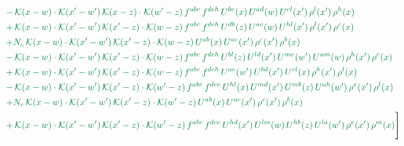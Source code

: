 \documentclass[10pt]{article}
\numberwithin{equation}{section}
\begin{document}
\begin{align}
&{\color{JIM} -\,\mathcal{K}(x-w)\cdot\mathcal{K}(x'-w')\,\mathcal{K}(x-z)\cdot\mathcal{K}(w'-z)\,f^{abc}\,f^{deh}\,U^{be}(x)\,U^{ad}(w)\,U^{cl}(x')\,\rho^{l}(x')\,\rho^{h}(x)} \notag\\
&{\color{JIM} +\,\mathcal{K}(x-w)\cdot\mathcal{K}(x'-w')\,\mathcal{K}(x'-z)\cdot\mathcal{K}(w-z)\,f^{abc}\,f^{deh}\,U^{db}(z)\,U^{ae}(w)\,U^{hl}(x')\,\rho^{l}(x')\,\rho^{c}(x)} \notag\\
&{\color{JIM} +N_{c}\,\mathcal{K}(x-w)\cdot\mathcal{K}(x'-w')\,\mathcal{K}(x'-z)\cdot\mathcal{K}(w-z)\,U^{ab}(x)\,U^{ac}(x')\,\rho^{c}(x')\,\rho^{b}(x)} \notag\\
&{\color{JIM} -\,\mathcal{K}(x-w)\cdot\mathcal{K}(x'-w')\,\mathcal{K}(x'-z)\cdot\mathcal{K}(w-z)\,f^{abc}\,f^{deh}\,U^{bl}(z)\,U^{ld}(x')\,U^{me}(w')\,U^{am}(w)\,\rho^{h}(x')\,\rho^{c}(x)} \notag\\
&{\color{JIM} +\,\mathcal{K}(x-w)\cdot\mathcal{K}(x'-w')\,\mathcal{K}(x'-z)\cdot\mathcal{K}(w-z)\,f^{abc}\,f^{deh}\,U^{ae}(w')\,U^{bd}(x')\,U^{cl}(x)\,\rho^{h}(x')\,\rho^{l}(x)} \notag\\
&{\color{JIM} -\,\mathcal{K}(x-w)\cdot\mathcal{K}(x'-w')\,\mathcal{K}(x'-z)\cdot\mathcal{K}(w'-z)\,f^{abc}\,f^{dce}\,U^{hl}(x)\,U^{md}(x')\,U^{mb}(z)\,U^{ah}(w')\,\rho^{e}(x')\,\rho^{l}(x)} \notag\\
&{\color{JIM} +N_{c}\,\mathcal{K}(x-w)\cdot\mathcal{K}(x'-w')\,\mathcal{K}(x'-z)\cdot\mathcal{K}(w'-z)\,U^{ab}(x)\,U^{ac}(x')\,\rho^{c}(x')\,\rho^{b}(x)} \notag\\
&{\color{JIM} +\,\mathcal{K}(x-w)\cdot\mathcal{K}(x'-w')\,\mathcal{K}(x'-z)\cdot\mathcal{K}(w'-z)\,f^{abc}\,f^{dce}\,U^{hd}(x')\,U^{lm}(w)\,U^{hb}(z)\,U^{la}(w')\,\rho^{e}(x')\,\rho^{m}(x)}\Bigg] \end{align}
\end{document}
